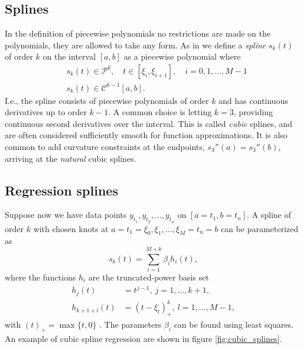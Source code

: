 \documentclass[a4paper, 10pt]{memoir}
\theoremstyle{plain}
\theoremstyle{definition}
\theoremstyle{remark}
\begin{document}
\subsection{Splines}
In the definition of piecewise polynomials no restrictions are made on the polynomials, they are allowed to take any form.
As in \cite{quarteroni} we define a \textit{spline} $s_k(t)$ of order $k$ on the interval $[a,b]$ as a piecewise polynomial where
\begin{align*}
        &s_k(t) \in \mathcal{P}^k , \quad t \in [\xi_i, \xi_{i+1}],\quad i = 0, 1, \hdots, M-1 \\
        &s_k(t) \in \mathcal{C}^{k - 1}[a, b].
\end{align*}
I.e., the spline consists of piecewise polynomials of order $k$ and has continuous derivatives up to order $k - 1$.
A common choice is letting $k = 3$, providing continuous second derivatives over the interval.
This is called \textit{cubic} splines, and are often considered sufficiently smooth for function approximations.
It is also common to add curvature constraints at the endpoints, $s_3''(a) = s_3''(b)$, arriving at the \textit{natural} cubic splines.

\subsection{Regression splines}
Suppose now we have data points $y_{t_1}, y_{t_2}, \hdots, y_{t_n}$ on $[a = t_1, b = t_n]$. 
A spline of order $k$ with chosen knots at $a = t_1 = \xi_0, \xi_1, \hdots, \xi_{M} = t_n = b$ can be parameterized as 
\begin{equation}\label{eq:lsq_spline}
        s_k(t) = \sum_{i = 1}^{M + k} \beta_i h_i(t),
\end{equation}
where the functions $h_i$ are the truncated-power basis set
\begin{align*}
        h_j(t) &= t^{j - 1}, \ j = 1, \hdots, k+1, \\
        h_{k+1+l}(t) &= (t - \xi_l)_+^k, \ l = 1, \hdots, M-1,
\end{align*}
with $(t)_+ = \max_{} \{ t, 0 \}$ \cite{hastie}.
The parameters $\beta_i$ can be found using least squares.
An example of cubic spline regression are shown in figure \ref{fig:cubic_splines}.
\end{document}
